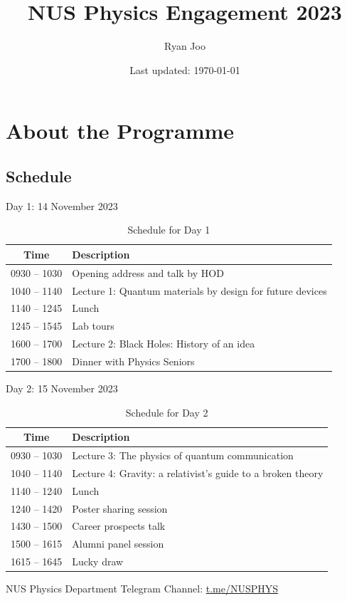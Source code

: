 \documentclass[12pt,a4paper]{article}
\title{NUS Physics Engagement 2023}
\author{Ryan Joo}
\date{Last updated: \today}
\begin{document}
\maketitle
\tableofcontents
\pagebreak

\section{About the Programme}
\subsection{Schedule}
Day 1: 14 November 2023
\begin{table}[H]
\centering
\begin{tabular}{c|l}
\hline\hline
Time & Description \\
\hline
0930 -- 1030 & Opening address and talk by HOD \\
1040 -- 1140 & Lecture 1: Quantum materials by design for future devices \\
1140 -- 1245 & Lunch \\
1245 -- 1545 & Lab tours \\
1600 -- 1700 & Lecture 2: Black Holes: History of an idea \\
1700 -- 1800 & Dinner with Physics Seniors \\
\hline\hline
\end{tabular}
\caption{Schedule for Day 1}
\end{table}

Day 2: 15 November 2023
\begin{table}[H]
\centering
\begin{tabular}{c|l}
\hline\hline
Time & Description \\
\hline
0930 -- 1030 & Lecture 3: The physics of quantum communication \\
1040 -- 1140 & Lecture 4: Gravity: a relativist's guide to a broken theory \\
1140 -- 1240 & Lunch \\
1240 -- 1420 & Poster sharing session \\
1430 -- 1500 & Career prospects talk \\
1500 -- 1615 & Alumni panel session \\
1615 -- 1645 & Lucky draw \\
\hline\hline
\end{tabular}
\caption{Schedule for Day 2}
\end{table}

NUS Physics Department Telegram Channel: \url{t.me/NUSPHYS}
\pagebreak
\end{document}

